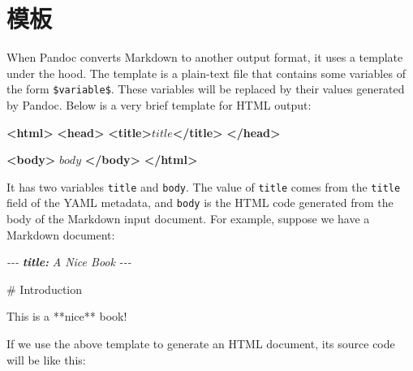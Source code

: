 \documentclass[
  12pt,
]{krantz}
\newenvironment{Shaded}{\begin{snugshade}}{\end{snugshade}}
\newcommand{\AnnotationTok}[1]{\textcolor[rgb]{0.56,0.35,0.01}{\textbf{\textit{#1}}}}
\newcommand{\CommentTok}[1]{\textcolor[rgb]{0.56,0.35,0.01}{\textit{#1}}}
\newcommand{\FunctionTok}[1]{\textcolor[rgb]{0.00,0.00,0.00}{#1}}
\newcommand{\KeywordTok}[1]{\textcolor[rgb]{0.13,0.29,0.53}{\textbf{#1}}}
\newcommand{\NormalTok}[1]{#1}
\theoremstyle{definition}
\theoremstyle{definition}
\theoremstyle{definition}
\theoremstyle{definition}
\theoremstyle{remark}
\begin{document}
\hypertarget{ux6a21ux677f}{%
\section{模板}\label{ux6a21ux677f}}

When Pandoc converts Markdown to another output format, it uses a template under the hood. The template is a plain-text file that contains some variables of the form \texttt{\$variable\$}. These variables will be replaced by their values generated by Pandoc. Below is a very brief template for HTML output:

\begin{Shaded}
\begin{Highlighting}[]
\KeywordTok{\textless{}html\textgreater{}}
  \KeywordTok{\textless{}head\textgreater{}}
    \KeywordTok{\textless{}title\textgreater{}}\NormalTok{$title$}\KeywordTok{\textless{}/title\textgreater{}}
  \KeywordTok{\textless{}/head\textgreater{}}
  
  \KeywordTok{\textless{}body\textgreater{}}
\NormalTok{  $body$}
  \KeywordTok{\textless{}/body\textgreater{}}
\KeywordTok{\textless{}/html\textgreater{}}
\end{Highlighting}
\end{Shaded}

It has two variables \texttt{title} and \texttt{body}. The value of \texttt{title} comes from the \texttt{title} field of the YAML metadata, and \texttt{body} is the HTML code generated from the body of the Markdown input document. For example, suppose we have a Markdown document:

\begin{Shaded}
\begin{Highlighting}[]
\CommentTok{{-}{-}{-}}
\AnnotationTok{title:}\CommentTok{ A Nice Book}
\CommentTok{{-}{-}{-}}

\FunctionTok{\# Introduction}

\NormalTok{This is a **nice** book!}
\end{Highlighting}
\end{Shaded}

If we use the above template to generate an HTML document, its source code will be like this:
\end{document}
